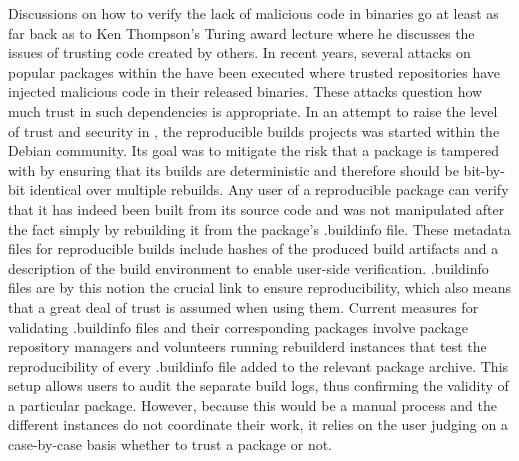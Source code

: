 \documentclass[english, biblatex, digitaloutput]{kththesis}
\begin{document}

Discussions on how to verify the lack of malicious code in binaries go at least as far back as to Ken Thompson's Turing award lecture \cite{thompson_reflections_1984} where he discusses the issues of trusting code created by others. In recent years, several attacks on popular packages within the  have been executed \cite{lamb_reproducible_2021} where trusted repositories have injected malicious code in their released binaries. These attacks question how much trust in such dependencies is appropriate. In an attempt to raise the level of trust and security in , the reproducible builds projects \cite{reproducible_builds_project} was started within the Debian community. Its goal was to mitigate the risk that a package is tampered with by ensuring that its builds are deterministic and therefore should be bit-by-bit identical over multiple rebuilds. Any user of a reproducible package can verify that it has indeed been built from its source code and was not manipulated after the fact simply by rebuilding it from the package's .buildinfo file. These metadata files for reproducible builds include hashes of the produced build artifacts and a description of the build environment to enable user-side verification. .buildinfo files are by this notion the crucial link to ensure reproducibility, which also means that a great deal of trust is assumed when using them. Current measures for validating .buildinfo files and their corresponding packages involve package repository managers and volunteers running rebuilderd \cite{rebuilderd_public_nodate} instances that test the reproducibility of every .buildinfo file added to the relevant package archive. This setup allows users to audit the separate build logs, thus confirming the validity of a particular package. However, because this would be a manual process and the different instances do not coordinate their work, it relies on the user judging on a case-by-case basis whether to trust a package or not.
\end{document}
